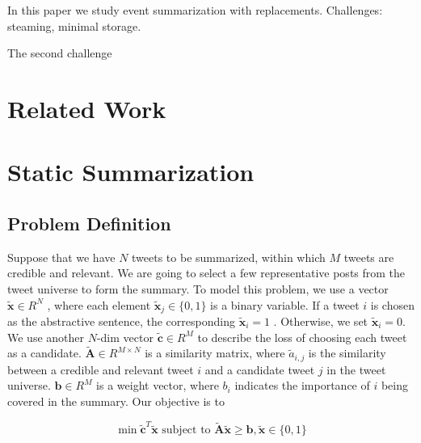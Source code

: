 \documentclass{article}
\begin{document}
In this paper we study event summarization with replacements.  Challenges: steaming, minimal storage. 

The second challenge 





\section{Related Work}

\section{Static Summarization}
\subsection{Problem Definition}
Suppose that we have $N$ tweets to be summarized, within which $M$ tweets are credible and relevant. We are going to select a few representative posts from the tweet universe to form the summary. To model this problem, we use a vector $\tilde{\mathbf{x}}\in R^N$ , where each element $\tilde{\mathbf{x}}_j\in \{0,1\}$ is a binary variable. If a tweet $i$ is chosen as the abstractive sentence, the corresponding $\tilde{\mathbf{x}}_i=1$ . Otherwise, we set  $\tilde{\mathbf{x}}_i=0$. We use another $N$-dim vector $\tilde{\mathbf{c}}\in R^M$ to describe the loss of choosing each tweet as a candidate. $\tilde{\mathbf{A}}\in R^{M\times N}$  is a similarity matrix, where $\tilde{a}_{i,j}$  is the similarity between a credible and relevant tweet $i$ and a candidate tweet $j$ in the tweet universe. $\mathbf{b}\in R^{M}$ is a weight vector, where $b_{i}$ indicates the importance of $i$ being covered in the summary. Our objective is to

\begin{equation*}
\min \tilde{\mathbf{c}}^T\tilde{\mathbf{x}}\textrm{ subject to } \tilde{\mathbf{A}}\tilde{\mathbf{x}}\geq \mathbf{b}, \tilde{\mathbf{x}}\in \{0,1\}
\end{equation*}
\end{document}
